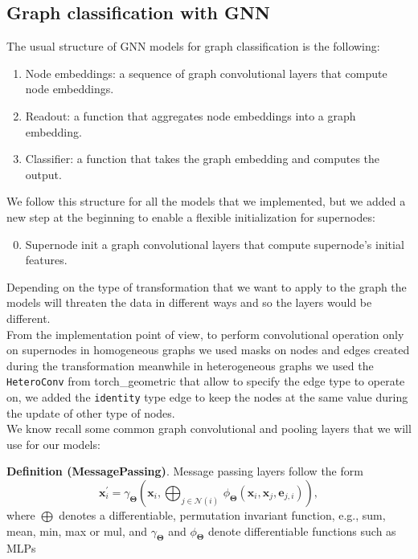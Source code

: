 \documentclass[twoside,11pt]{article}
\begin{document}
\subsection{Graph classification with GNN} %
\label{sub:graph_classification_with_gnn}
The usual structure of GNN models for graph classification is the following:
\begin{enumerate}
    \item Node embeddings: a sequence of graph convolutional layers that compute node embeddings.
    \item Readout: a function that aggregates node embeddings into a graph embedding.
    \item Classifier: a function that takes the graph embedding and computes the output.
\end{enumerate}
    \noindent
    We follow this structure for all the models that we implemented, but we added a new step at the beginning to enable a flexible initialization for supernodes:
    \begin{enumerate}
        \setcounter{enumi}{-1}
        \item Supernode init a graph convolutional layers that compute supernode's initial features.
    \end{enumerate}
\noindent
Depending on the type of transformation that we want to apply to the graph the models will threaten the data in different ways and so the layers would be different.\\
From the implementation point of view, to perform convolutional operation only on supernodes in homogeneous graphs we used masks on nodes and edges created during the transformation meanwhile in heterogeneous graphs we used the \texttt{HeteroConv} from torch\_geometric that allow to specify the edge type to operate on, we added the \texttt{identity} type edge to keep the nodes at the same value during the update of other type of nodes.\\


\noindent
We know recall some common graph convolutional and pooling layers that we will use for our models:

\noindent
{\bf Definition (MessagePassing)}.
{
        Message passing layers follow the form
        \[
            \mathbf{x}_i^{\prime} = \gamma_{\mathbf{\Theta}} \left( \mathbf{x}_i, \bigoplus_{j \in \mathcal{N}(i)} \, \phi_{\mathbf{\Theta}} \left(\mathbf{x}_i, \mathbf{x}_j,\mathbf{e}_{j,i}\right) \right),
        \]
        where \( \bigoplus \) denotes a differentiable, permutation invariant function, e.g., sum, mean, min, max or mul, and \( \gamma_{\mathbf{\Theta}} \) and \( \phi_{\mathbf{\Theta}} \) denote differentiable functions such as MLPs
}\\
\end{document}
